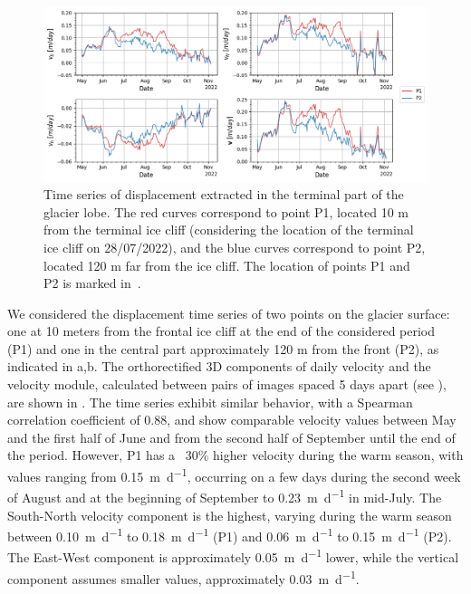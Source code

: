 \begin{figure}[ht]
  \includegraphics[width=\textwidth]{4_ts_velocities.png}
  \caption{Time series of displacement extracted in the terminal part of the glacier
    lobe. The red curves correspond to point P1, located 10 m from the terminal ice cliff (considering the location of the terminal ice cliff on 28/07/2022), and the blue curves correspond to point P2, located 120 m far from the ice
    cliff. The location of points P1 and P2 is marked in~.}
  \label{fig:4:velocity_ts}
\end{figure}

We considered the displacement time series of two points on the glacier surface: one at 10 meters from the frontal ice cliff at the end of the considered period (P1) and one in the central part approximately 120 m from the front (P2), as indicated in a,b.
The orthorectified 3D components of daily velocity and the velocity module, calculated between pairs of images spaced 5 days apart (see ), are shown in .
The time series exhibit similar behavior, with a Spearman correlation coefficient of 0.88, and show comparable velocity values between May and the first half of June and
from the second half of September until the end of the period.
However, P1 has a ~30\% higher velocity during the warm season, with values ranging from \SI{0.15}{\meter\per\day}, occurring on a few days during the second week of August and at the beginning of September to \SI{0.23}{\meter\per\day} in mid-July.
The South-North velocity component is the highest, varying during the warm season between \SI{0.10}{\meter\per\day} to \SI{0.18}{\meter\per\day} (P1) and \SI{0.06}{\meter\per\day} to \SI{0.15}{\meter\per\day} (P2).
The East-West component is approximately \SI{0.05}{\meter\per\day} lower, while the vertical component assumes smaller values, approximately \SI{0.03}{\meter\per\day}.

